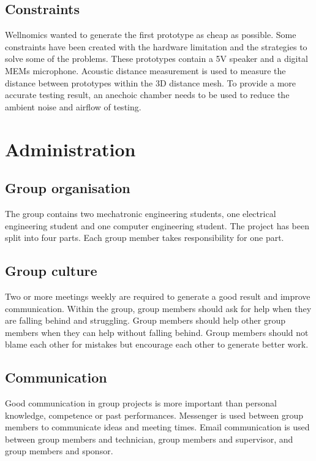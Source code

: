 \documentclass[9pt, a4paper]{report}
\begin{document}
	\subsection*{Constraints}
	Wellnomics wanted to generate the first prototype as cheap as possible. Some constraints have been created with the hardware limitation and the strategies to solve some of the problems. These prototypes contain a 5V speaker and a digital MEMs microphone. Acoustic distance measurement is used to measure the distance between prototypes within the 3D distance mesh. To provide a more accurate testing result, an anechoic chamber needs to be used to reduce the ambient noise and airflow of testing.\\
	
	\section*{Administration}
		
		\subsection*{Group organisation}
			The group contains two mechatronic engineering students, one electrical engineering student and one computer engineering student. The project has been split into four parts. Each group member takes responsibility for one part.
		\subsection*{Group culture}
			Two or more meetings weekly are required to generate a good result and improve communication. Within the group, group members should ask for help when they are falling behind and struggling. Group members should help other group members when they can help without falling behind. Group members should not blame each other for mistakes but encourage each other to generate better work.
		\subsection*{Communication }
			Good communication in group projects is more important than personal knowledge, competence or past performances. Messenger is used between group members to communicate ideas and meeting times. Email communication is used between group members and technician, group members and supervisor, and group members and sponsor.\\
			
\end{document}
